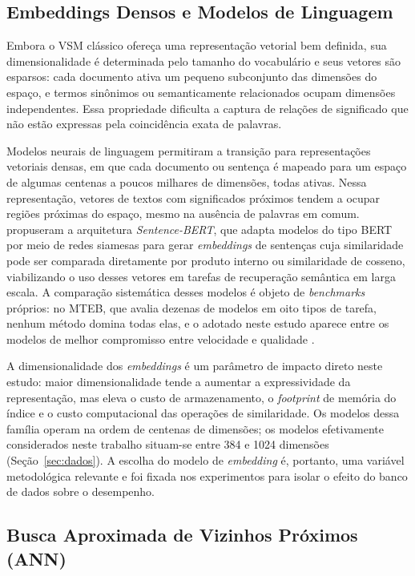 \subsection{Embeddings Densos e Modelos de Linguagem}

Embora o VSM clássico ofereça uma representação vetorial bem definida, sua dimensionalidade é determinada pelo tamanho do vocabulário e seus vetores são esparsos: cada documento ativa um pequeno subconjunto das dimensões do espaço, e termos sinônimos ou semanticamente relacionados ocupam dimensões independentes. Essa propriedade dificulta a captura de relações de significado que não estão expressas pela coincidência exata de palavras.

Modelos neurais de linguagem permitiram a transição para representações vetoriais densas, em que cada documento ou sentença é mapeado para um espaço de algumas centenas a poucos milhares de dimensões, todas ativas. Nessa representação, vetores de textos com significados próximos tendem a ocupar regiões próximas do espaço, mesmo na ausência de palavras em comum.  propuseram a arquitetura \textit{Sentence-BERT}, que adapta modelos do tipo BERT por meio de redes siamesas para gerar \textit{embeddings} de sentenças cuja similaridade pode ser comparada diretamente por produto interno ou similaridade de cosseno, viabilizando o uso desses vetores em tarefas de recuperação semântica em larga escala. A comparação sistemática desses modelos é objeto de \textit{benchmarks} próprios: no MTEB, que avalia dezenas de modelos em oito tipos de tarefa, nenhum método domina todas elas, e o  adotado neste estudo aparece entre os modelos de melhor compromisso entre velocidade e qualidade \cite{muennighoff2023mteb}.

A dimensionalidade dos \textit{embeddings} é um parâmetro de impacto direto neste estudo: maior dimensionalidade tende a aumentar a expressividade da representação, mas eleva o custo de armazenamento, o \textit{footprint} de memória do índice e o custo computacional das operações de similaridade. Os modelos dessa família operam na ordem de centenas de dimensões; os modelos efetivamente considerados neste trabalho situam-se entre 384 e 1024 dimensões (Seção~\ref{sec:dados}). A escolha do modelo de \textit{embedding} é, portanto, uma variável metodológica relevante e foi fixada nos experimentos para isolar o efeito do banco de dados sobre o desempenho.

\subsection{Busca Aproximada de Vizinhos Próximos (ANN)}


